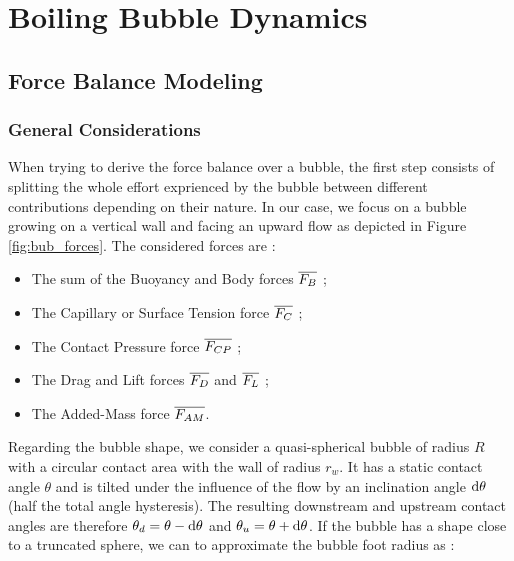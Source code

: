 
\chapter{Boiling Bubble Dynamics} %

\label{ch:name} %




\section{Force Balance Modeling}\label{sec:forces}

\subsection{General Considerations}\label{subsec:general}

When trying to derive the force balance over a bubble, the first step consists of splitting the whole effort exprienced by the bubble between different contributions depending on their nature. In our case, we focus on a bubble growing on a vertical wall and facing an upward flow as depicted in Figure \ref{fig:bub_forces}. The considered forces are :



\begin{itemize}
\item The sum of the Buoyancy and Body forces $\overline{F_{B}}$ ;
\item The Capillary or Surface Tension force $\overline{F_{C}}$ ;
\item The Contact Pressure force $\overline{F_{CP}}$ ;
\item The Drag and Lift forces $\overline{F_{D}}$ and $\overline{F_{L}}$ ;
\item The Added-Mass force $\overline{F_{AM}}$.
\end{itemize}


Regarding the bubble shape, we consider a quasi-spherical bubble of radius $R$ with a circular contact area with the wall of radius $r_{w}$. It has a static contact angle $\theta$ and is tilted under the influence of the flow by an inclination angle $\mathrm{d}\theta$ (half the total angle hysteresis). The resulting downstream and upstream contact angles are therefore $\theta_{d}=\theta-\mathrm{d}\theta$ and $\theta_{u}=\theta+\mathrm{d}\theta$. If the bubble has a shape close to a truncated sphere, we can to approximate the bubble foot radius as :

